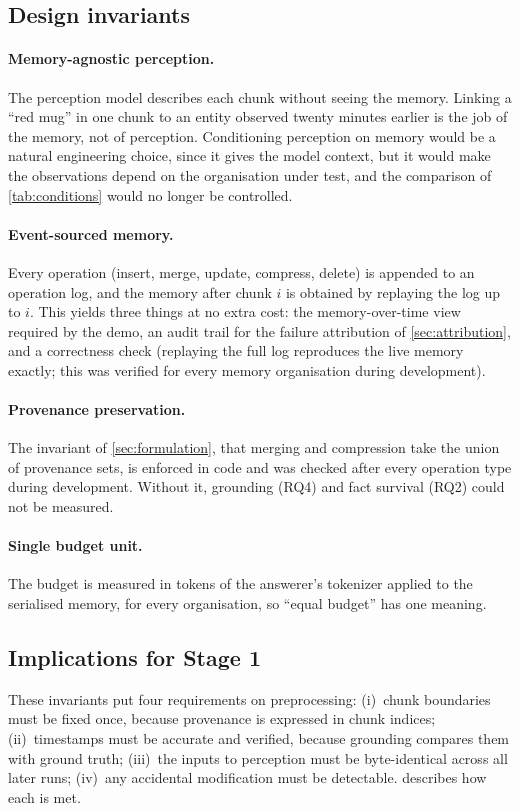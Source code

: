 \subsection{Design invariants}

\paragraph{Memory-agnostic perception.}
The perception model describes each chunk without seeing the memory. Linking a
``red mug'' in one chunk to an entity observed twenty minutes earlier is the
job of the memory, not of perception. Conditioning perception on memory would
be a natural engineering choice, since it gives the model context, but it
would make the observations depend on the organisation under test, and the
comparison of \cref{tab:conditions} would no longer be controlled.

\paragraph{Event-sourced memory.}
Every operation (insert, merge, update, compress, delete) is appended to an
operation log, and the memory after chunk $i$ is obtained by replaying the log
up to $i$. This yields three things at no extra cost: the memory-over-time view
required by the demo, an audit trail for the failure attribution of
\cref{sec:attribution}, and a correctness check (replaying the full log
reproduces the live memory exactly; this was verified for every memory
organisation during development).

\paragraph{Provenance preservation.}
The invariant of \cref{sec:formulation}, that merging and compression take the
union of provenance sets, is enforced in code and was checked after every
operation type during development. Without it, grounding (RQ4) and fact survival (RQ2) could not
be measured.

\paragraph{Single budget unit.}
The budget is measured in tokens of the answerer's tokenizer applied to the
serialised memory, for every organisation, so ``equal budget'' has one
meaning.

\subsection{Implications for Stage 1}
These invariants put four requirements on preprocessing: (i)~chunk boundaries
must be fixed once, because provenance is expressed in chunk indices;
(ii)~timestamps must be accurate and verified, because grounding compares them
with ground truth; (iii)~the inputs to perception must be byte-identical
across all later runs; (iv)~any accidental modification must be detectable.
 describes how each is met.
